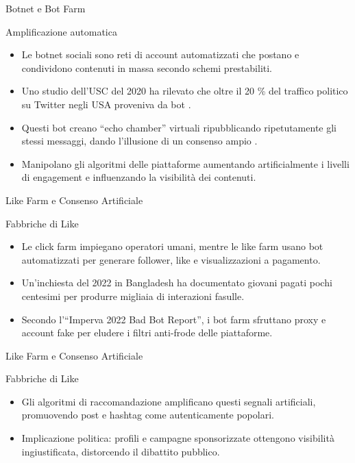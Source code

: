 \documentclass[12pt]{beamer}
\begin{document}
\begin{frame}{Botnet e Bot Farm}
  \small
  \begin{alertblock}{Amplificazione automatica}
    \begin{itemize}
      \item Le botnet sociali sono reti di account automatizzati che postano e condividono contenuti in massa secondo schemi prestabiliti.
      \item Uno studio dell’USC del 2020 ha rilevato che oltre il 20 \% del traffico politico su Twitter negli USA proveniva da bot \cite{uscsocial2020}.
      \item Questi bot creano “echo chamber” virtuali ripubblicando ripetutamente gli stessi messaggi, dando l’illusione di un consenso ampio \cite{echolab2020}.
      \item Manipolano gli algoritmi delle piattaforme aumentando artificialmente i livelli di engagement e influenzando la visibilità dei contenuti.
    \end{itemize}
  \end{alertblock}
\end{frame}


\begin{frame}{Like Farm e Consenso Artificiale}

  \begin{alertblock}{Fabbriche di Like}
    \begin{itemize}
      \item Le click farm impiegano operatori umani, mentre le like farm usano bot automatizzati per generare follower, like e visualizzazioni a pagamento.
      \item Un’inchiesta del 2022 in Bangladesh ha documentato giovani pagati pochi centesimi per produrre migliaia di interazioni fasulle.\cite{channel4_bangladesh}
      \item Secondo l’“Imperva 2022 Bad Bot Report”, i bot farm sfruttano proxy e account fake per eludere i filtri anti-frode delle piattaforme.\cite{imperva_badbot2022}
    \end{itemize}
  \end{alertblock}
\end{frame}

\begin{frame}{Like Farm e Consenso Artificiale}
  \begin{alertblock}{Fabbriche di Like}
    \begin{itemize}
      \item Gli algoritmi di raccomandazione amplificano questi segnali artificiali, promuovendo post e hashtag come autenticamente popolari.
      \item Implicazione politica: profili e campagne sponsorizzate ottengono visibilità ingiustificata, distorcendo il dibattito pubblico.
    \end{itemize}
  \end{alertblock}
\end{frame}
\end{document}
